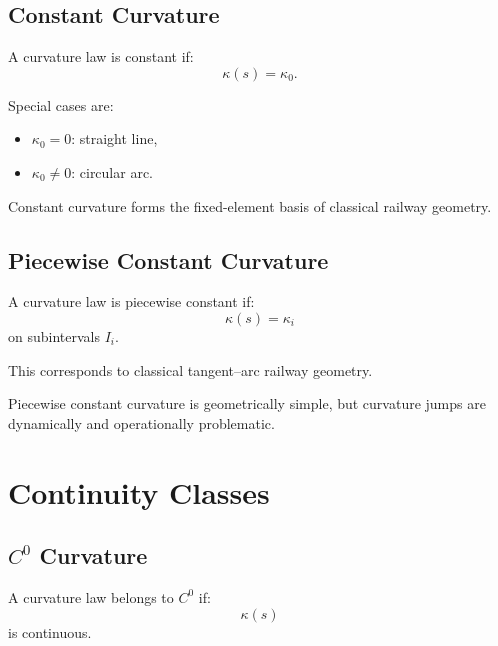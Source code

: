 \subsection{Constant Curvature}

\begin{definition}
\label{def:constant-curvature-class}
A curvature law is constant if:
\[
\kappa(s)=\kappa_0.
\]
\end{definition}

Special cases are:
\begin{itemize}
\item \(\kappa_0=0\): straight line,
\item \(\kappa_0\neq 0\): circular arc.
\end{itemize}

Constant curvature forms the fixed-element basis of classical railway
geometry.


\subsection{Piecewise Constant Curvature}

\begin{definition}
\label{def:piecewise-constant-curvature}
A curvature law is piecewise constant if:
\[
\kappa(s)
=
\kappa_i
\]
on subintervals \(I_i\).
\end{definition}

This corresponds to classical tangent--arc railway geometry.

Piecewise constant curvature is geometrically simple, but curvature
jumps are dynamically and operationally problematic.

\section{Continuity Classes}

\subsection{\texorpdfstring{$C^0$}{C0} Curvature}

\begin{definition}
\label{def:c0-curvature}
A curvature law belongs to \(C^0\) if:
\[
\kappa(s)
\]
is continuous.
\end{definition}

